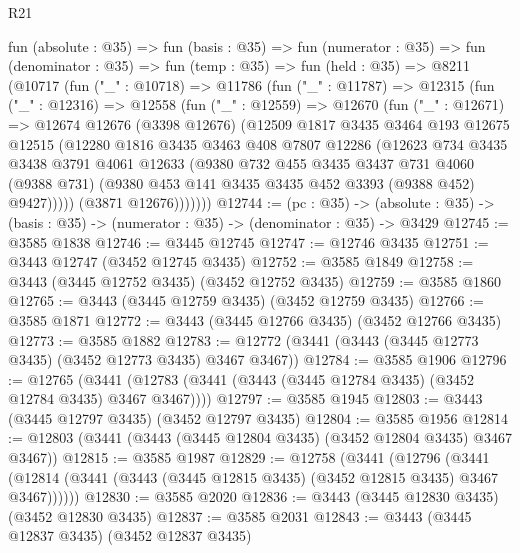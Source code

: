 \begin{lexlean}{R21}
\begin{coremodule}
  fun (absolute : @35) =>
  fun (basis : @35) =>
  fun (numerator : @35) =>
  fun (denominator : @35) =>
  fun (temp : @35) =>
  fun (held : @35) =>
  @8211
    (@10717
      (fun ("_" : @10718) =>
      @11786
        (fun ("_" : @11787) =>
        @12315
          (fun ("_" : @12316) =>
          @12558
            (fun ("_" : @12559) =>
            @12670
              (fun ("_" : @12671) =>
              @12674
                @12676
                (@3398 @12676)
                (@12509
                  @1817
                  @3435
                  @3464
                  @193
                  @12675
                  @12515
                  (@12280
                    @1816
                    @3435
                    @3463
                    @408
                    @7807
                    @12286
                    (@12623
                      @734
                      @3435
                      @3438
                      @3791
                      @4061
                      @12633
                      (@9380
                        @732
                        @455
                        @3435
                        @3437
                        @731
                        @4060
                        (@9388 @731)
                        (@9380 @453 @141 @3435 @3435 @452 @3393 (@9388 @452) @9427)))))
                (@3871 @12676)))))))
@12744 := (pc : @35) ->
  (absolute : @35) -> (basis : @35) -> (numerator : @35) -> (denominator : @35) -> @3429
@12745 := @3585 @1838
@12746 := @3445 @12745
@12747 := @12746 @3435
@12751 := @3443 @12747 (@3452 @12745 @3435)
@12752 := @3585 @1849
@12758 := @3443 (@3445 @12752 @3435) (@3452 @12752 @3435)
@12759 := @3585 @1860
@12765 := @3443 (@3445 @12759 @3435) (@3452 @12759 @3435)
@12766 := @3585 @1871
@12772 := @3443 (@3445 @12766 @3435) (@3452 @12766 @3435)
@12773 := @3585 @1882
@12783 := @12772 (@3441 (@3443 (@3445 @12773 @3435) (@3452 @12773 @3435) @3467 @3467))
@12784 := @3585 @1906
@12796 := @12765
    (@3441 (@12783 (@3441 (@3443 (@3445 @12784 @3435) (@3452 @12784 @3435) @3467 @3467))))
@12797 := @3585 @1945
@12803 := @3443 (@3445 @12797 @3435) (@3452 @12797 @3435)
@12804 := @3585 @1956
@12814 := @12803 (@3441 (@3443 (@3445 @12804 @3435) (@3452 @12804 @3435) @3467 @3467))
@12815 := @3585 @1987
@12829 := @12758
    (@3441
      (@12796
        (@3441 (@12814 (@3441 (@3443 (@3445 @12815 @3435) (@3452 @12815 @3435) @3467 @3467))))))
@12830 := @3585 @2020
@12836 := @3443 (@3445 @12830 @3435) (@3452 @12830 @3435)
@12837 := @3585 @2031
@12843 := @3443 (@3445 @12837 @3435) (@3452 @12837 @3435)

\end{coremodule}
\end{lexlean}
